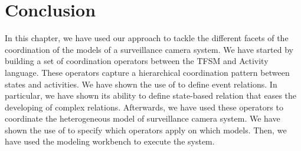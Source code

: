 \section{Conclusion}
In this chapter, we have used our approach to tackle the different facets of the coordination of the models of a surveillance camera system. We have started by building a set of coordination operators between the TFSM and Activity language. These operators capture a hierarchical coordination pattern between states and activities. We have shown the use of \moccml to define event relations. In particular, we have shown its ability to define state-based relation that eases the developing of complex relations. Afterwards, we have used these operators to coordinate the heterogeneous model of surveillance camera system. We have shown the use of \bflow to specify which operators apply on which models. Then, we have used the modeling workbench to execute the system. 

 
